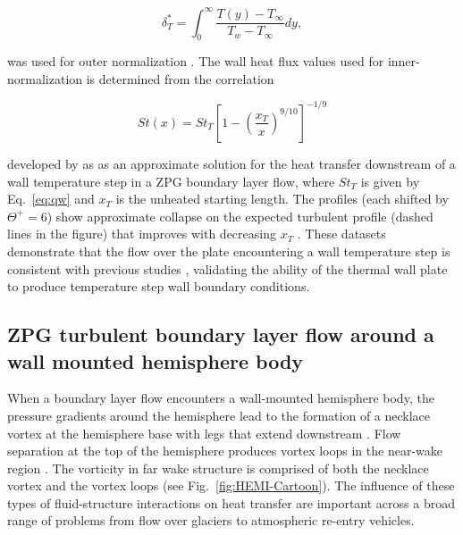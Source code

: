\begin{equation}
\delta_T^* = \int_0^\infty \frac{T(y) - T_\infty}{T_w - T_\infty} dy,
\end{equation}

\noindent was used for outer normalization \cite{Antonia1977}.  The wall heat flux values used for inner-normalization is determined from the correlation 

\begin{equation}
St(x) = St_T \left[ 1 - \left(\frac{x_T}{x}\right)^{9/10}\right]^{-1/9}
\label{eq:st_correction}
\end{equation}

\noindent developed by \cite{Reynolds1958} as as an approximate solution for the heat transfer downstream of a wall temperature step in a ZPG boundary layer flow, where $St_T$ is given by Eq.~\ref{eq:qw} and $x_T$ is the unheated starting length. The profiles (each shifted by $\Theta^+ = 6$) show approximate collapse on the expected turbulent profile (dashed lines in the figure) that improves with decreasing $x_T$ . These datasets demonstrate that the flow over the plate encountering a wall temperature step is consistent with previous studies \cite{Reynolds1958, Hoffmann1979}, validating the ability of the thermal wall plate to produce temperature step wall boundary conditions.



\subsection{ZPG turbulent boundary layer flow around a wall mounted hemisphere body}

When a boundary layer flow encounters a wall-mounted hemisphere body, the pressure gradients around the hemisphere lead to the formation of a necklace vortex at the hemisphere base with legs that extend downstream \cite{simpson2001}. Flow separation at the top of the hemisphere produces vortex loops in the near-wake region \cite{Savory1986,Hansen1975}. The vorticity in far wake structure is comprised of both the necklace vortex and the vortex loops (see Fig.~\ref{fig:HEMI-Cartoon}). The influence of these types of fluid-structure interactions on heat transfer are important across a broad range of problems from flow over glaciers to atmospheric re-entry vehicles. 

